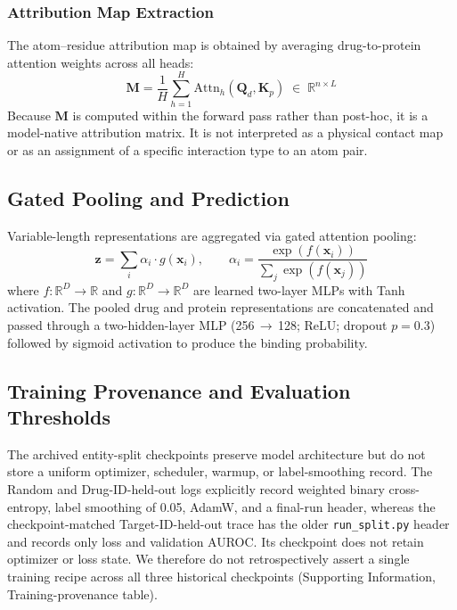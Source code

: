 \documentclass[fleqn,10pt]{wlscirep}
\begin{document}
\subsubsection{Attribution Map Extraction}

The atom--residue attribution map is obtained by averaging drug-to-protein
attention weights across all heads:
\begin{equation}
\mathbf{M} = \frac{1}{H}\sum_{h=1}^{H}
  \mathrm{Attn}_h(\mathbf{Q}_d,\mathbf{K}_p)
  \;\in\;\mathbb{R}^{n\times L}
\label{eq:interaction_map}
\end{equation}
Because $\mathbf{M}$ is computed within the forward pass rather than post-hoc,
it is a model-native attribution matrix.  It is not interpreted as a physical
contact map or as an assignment of a specific interaction type to an atom pair.

\subsection{Gated Pooling and Prediction}

Variable-length representations are aggregated via gated attention pooling:
\begin{equation}
\mathbf{z} = \sum_{i}\alpha_i\cdot g(\mathbf{x}_i),\qquad
\alpha_i = \frac{\exp(f(\mathbf{x}_i))}{\sum_j\exp(f(\mathbf{x}_j))}
\end{equation}
where $f\colon\mathbb{R}^D\to\mathbb{R}$ and
$g\colon\mathbb{R}^D\to\mathbb{R}^D$ are learned two-layer MLPs with Tanh
activation.  The pooled drug and protein representations are concatenated and
passed through a two-hidden-layer MLP (256\,$\to$\,128; ReLU; dropout $p=0.3$)
followed by sigmoid activation to produce the binding probability.

\subsection{Training Provenance and Evaluation Thresholds}

The archived entity-split checkpoints preserve model architecture but do not
store a uniform optimizer, scheduler, warmup, or label-smoothing record. The
Random and Drug-ID-held-out logs explicitly record weighted binary
cross-entropy, label smoothing of 0.05, AdamW, and a final-run header, whereas
the checkpoint-matched Target-ID-held-out trace has the older
\texttt{run\_split.py} header and records only loss and validation AUROC. Its
checkpoint does not retain optimizer or loss state. We therefore do not
retrospectively assert a single training recipe across all three historical
checkpoints (Supporting Information, Training-provenance table).
\end{document}
